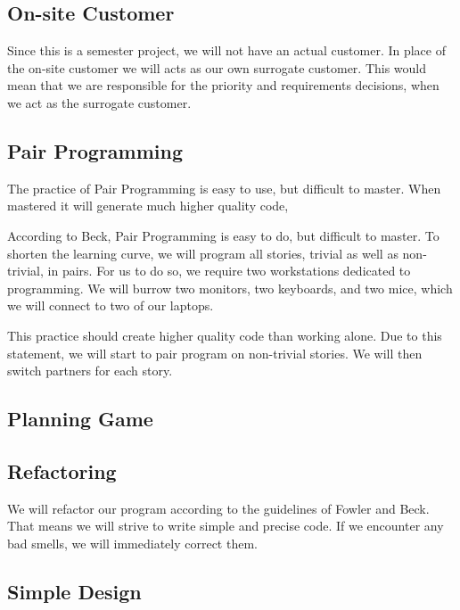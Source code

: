 \subsection{On-site Customer}
Since this is a semester project, we will not have an actual customer.
In place of the on-site customer we will acts as our own surrogate customer.
This would mean that we are responsible for the priority and requirements decisions, when we act as the surrogate customer.

\subsection{Pair Programming}
The practice of Pair Programming is easy to use, but difficult to master.
When mastered it will generate much higher quality code, 


According to Beck, Pair Programming is easy to do, but difficult to master.
To shorten the learning curve, we will program all stories, trivial as well as non-trivial, in pairs.
For us to do so, we require two workstations dedicated to programming.
We will burrow two monitors, two keyboards, and two mice, which we will connect to two of our laptops.

This practice should create higher quality code than working alone.
Due to this statement, we will start to pair program on non-trivial stories.
We will then switch partners for each story. 


\subsection{Planning Game}


\subsection{Refactoring}
We will refactor our program according to the guidelines of Fowler and Beck.
That means we will strive to write simple and precise code.
If we encounter any bad smells, we will immediately correct them.

\subsection{Simple Design}


